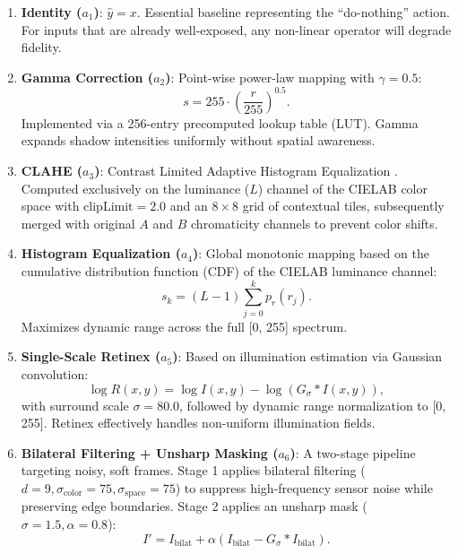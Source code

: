 \documentclass[journal]{IEEEtran}
\begin{document}
\begin{enumerate}
    \item \textbf{Identity ($a_1$)}: $\hat{y} = x$. Essential baseline representing the ``do-nothing'' action. For inputs that are already well-exposed, any non-linear operator will degrade fidelity.
    \item \textbf{Gamma Correction ($a_2$)}: Point-wise power-law mapping with $\gamma = 0.5$:
    \begin{equation}
    s = 255 \cdot \left(\frac{r}{255}\right)^{0.5}.
    \end{equation}
    Implemented via a 256-entry precomputed lookup table (LUT). Gamma expands shadow intensities uniformly without spatial awareness.
    \item \textbf{CLAHE ($a_3$)}: Contrast Limited Adaptive Histogram Equalization \cite{zuiderveld1994contrast}. Computed exclusively on the luminance ($L$) channel of the CIELAB color space with $\text{clipLimit} = 2.0$ and an $8 \times 8$ grid of contextual tiles, subsequently merged with original $A$ and $B$ chromaticity channels to prevent color shifts.
    \item \textbf{Histogram Equalization ($a_4$)}: Global monotonic mapping based on the cumulative distribution function (CDF) of the CIELAB luminance channel:
    \begin{equation}
    s_k = (L - 1) \sum_{j=0}^k p_r(r_j).
    \end{equation}
    Maximizes dynamic range across the full [0, 255] spectrum.
    \item \textbf{Single-Scale Retinex ($a_5$)}: Based on illumination estimation via Gaussian convolution:
    \begin{equation}
    \log R(x, y) = \log I(x, y) - \log (G_\sigma * I(x, y)),
    \end{equation}
    with surround scale $\sigma = 80.0$, followed by dynamic range normalization to [0, 255]. Retinex effectively handles non-uniform illumination fields.
    \item \textbf{Bilateral Filtering + Unsharp Masking ($a_6$)}: A two-stage pipeline targeting noisy, soft frames. Stage 1 applies bilateral filtering ($d=9, \sigma_{\text{color}}=75, \sigma_{\text{space}}=75$) to suppress high-frequency sensor noise while preserving edge boundaries. Stage 2 applies an unsharp mask ($\sigma=1.5, \alpha=0.8$):
    \begin{equation}
    I' = I_{\text{bilat}} + \alpha (I_{\text{bilat}} - G_\sigma * I_{\text{bilat}}).
    \end{equation}
\end{enumerate}
\end{document}
